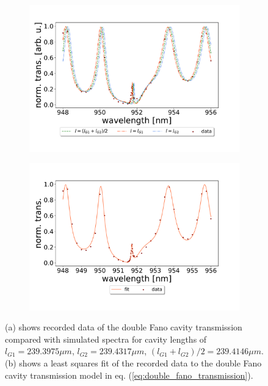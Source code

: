 \begin{figure}[h!]
    \centering
    \begin{subfigure}[b]{0.49\textwidth}
        \centering
        \includegraphics[width=\textwidth]{figures/results/238um_long_scan_sim_comparison.pdf}
        \caption{}
        \label{fig:238um_long_scan_sim_comparison}
    \end{subfigure}
    \begin{subfigure}[b]{0.49\textwidth}
        \centering
        \includegraphics[width=\textwidth]{figures/results/238um_long_scan_fit2.pdf}
        \caption{}
        \label{fig:238um_long_scan_fit}
    \end{subfigure}
    \caption{(a) shows recorded data of the double Fano cavity transmission compared with simulated spectra for cavity lengths of $l_{G1} = 239.3975 \mu m$, $l_{G2} = 239.4317 \mu m$, $(l_{G1} + l_{G2})/2 = 239.4146 \mu m$. (b) shows a least squares fit of the recorded data to the double Fano cavity transmission model in eq. (\ref{eq:double_fano_transmission}).}
    \label{fig:238um_cavity_fit_and_sim}
\end{figure}

